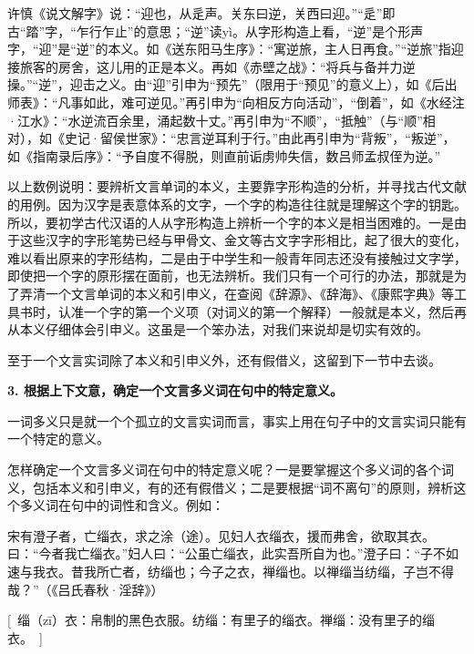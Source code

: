 \begin{entry}
\item[逆]许慎《说文解字》说：“迎也，从辵声。关东曰逆，关西曰迎。”“辵”即古“踏”字，“乍行乍止”的意思；“逆”读yì。从字形构造上看，“逆”是个形声字，“迎”是“逆”的本义。如《送东阳马生序》：“寓逆旅，主人日再食。”“逆旅”指迎接旅客的房舍，这儿用的正是本义。再如《赤壁之战》：“将兵与备并力逆操。”“逆”，迎击之义。由“迎”引申为“预先”（限用于“预见”的意义上），如《后出师表》：“凡事如此，难可逆见。”再引申为“向相反方向活动”，“倒着”，如《水经注·江水》：“水逆流百余里，涌起数十丈。”再引申为“不顺”，“抵触”（与“顺”相对），如《史记·留侯世家》：“忠言逆耳利于行。”由此再引申为“背叛”，“叛逆”，如《指南录后序》：“予自度不得脱，则直前诟虏帅失信，数吕师孟叔侄为逆。”
\end{entry}

以上数例说明：要辨析文言单词的本义，主要靠字形构造的分析，并寻找古代文献的用例。因为汉字是表意体系的文字，一个字的构造往往就是理解这个字的钥匙。所以，要初学古代汉语的人从字形构造上辨析一个字的本义是相当困难的。一是由于这些汉字的字形笔势已经与甲骨文、金文等古文字字形相比，起了很大的变化，难以看出原来的字形结构，二是由于中学生和一般青年同志还没有接触过文字学，即使把一个字的原形摆在面前，也无法辨析。我们只有一个可行的办法，那就是为了弄清一个文言单词的本义和引申义，在查阅《辞源》、《辞海》、《康熙字典》等工具书时，认准一个字的第一个义项（对词义的第一个解释）一般就是本义，然后再从本义仔细体会引申义。这虽是一个笨办法，对我们来说却是切实有效的。

至于一个文言实词除了本义和引申义外，还有假借义，这留到下一节中去谈。

\textbf{3. 根据上下文意，确定一个文言多义词在句中的特定意义。}

一词多义只是就一个个孤立的文言实词而言，事实上用在句子中的文言实词只能有一个特定的意义。

怎样确定一个文言多义词在句中的特定意义呢？一是要掌握这个多义词的各个词义，包括本义和引申义，有的还有假借义；二是要根据“词不离句”的原则，辨析这个多义词在句中的词性和含义。例如：

宋有澄子者，亡缁衣，求之涂（途）。见妇人衣缁衣，援而弗舍，欲取其衣。曰：“今者我亡缁衣。”妇人曰：“公虽亡缁衣，此实吾所自为也。”澄子曰：“子不如速与我衣。昔我所亡者，纺缁也；今子之衣，禅缁也。以禅缁当纺缁，子岂不得哉？”（《吕氏春秋·淫辞》）

[\ 缁（zī）衣：帛制的黑色衣服。纺缁：有里子的缁衣。禅缁：没有里子的缁衣。\ ]

